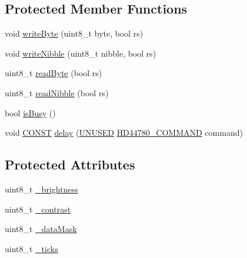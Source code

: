 \subsection*{Protected Member Functions}
\begin{DoxyCompactItemize}
\item 
void \hyperlink{classmhvlib_1_1_display___h_d44780___direct___connect_a9b90f3d4ef0af006c86a77ea40bff3ad}{write\-Byte} (uint8\-\_\-t byte, bool rs)
\item 
void \hyperlink{classmhvlib_1_1_display___h_d44780___direct___connect_a28a9d4a73be177052040f5bd598f3b6b}{write\-Nibble} (uint8\-\_\-t nibble, bool rs)
\item 
uint8\-\_\-t \hyperlink{classmhvlib_1_1_display___h_d44780___direct___connect_a4d0a9ca52ef1e532a8f68a7086833614}{read\-Byte} (bool rs)
\item 
uint8\-\_\-t \hyperlink{classmhvlib_1_1_display___h_d44780___direct___connect_a674d17f5e08fdcdd557afb2ac8d46a9b}{read\-Nibble} (bool rs)
\item 
bool \hyperlink{classmhvlib_1_1_display___h_d44780___direct___connect_ab9d47d3b9fc9b297724bc070b9cddb45}{is\-Busy} ()
\item 
void \hyperlink{io_8h_a0c33b494a68ce28497e7ce8e5e95feff}{C\-O\-N\-S\-T} \hyperlink{classmhvlib_1_1_display___h_d44780___direct___connect_a60f71f7e645c097613217ec8bc205356}{delay} (\hyperlink{io_8h_addf5ec070e9499d36b7f2009ce736076}{U\-N\-U\-S\-E\-D} \hyperlink{namespacemhvlib_a810a3cc703298cdd5d00c913cb1bfec9}{H\-D44780\-\_\-\-C\-O\-M\-M\-A\-N\-D} command)
\end{DoxyCompactItemize}
\subsection*{Protected Attributes}
\begin{DoxyCompactItemize}
\item 
uint8\-\_\-t \hyperlink{classmhvlib_1_1_display___h_d44780___direct___connect_aba2e5cf89a0de2c24ee7a6dd1d5a9069}{\-\_\-brightness}
\item 
uint8\-\_\-t \hyperlink{classmhvlib_1_1_display___h_d44780___direct___connect_a1872f4fa9a7ab8f11014ea8c5f8a74ba}{\-\_\-contrast}
\item 
uint8\-\_\-t \hyperlink{classmhvlib_1_1_display___h_d44780___direct___connect_ab0dffb5c1b886f64232746c8b79b5970}{\-\_\-data\-Mask}
\item 
uint8\-\_\-t \hyperlink{classmhvlib_1_1_display___h_d44780___direct___connect_a0ce9e9fada2886430619900c3a130049}{\-\_\-ticks}
\end{DoxyCompactItemize}


